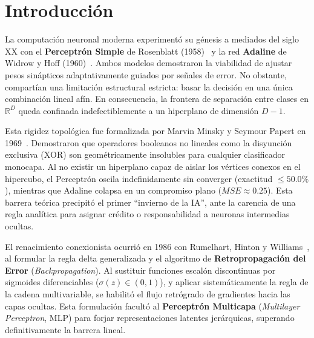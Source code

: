 \documentclass{article}
\begin{document}
\vspace{0.35cm}

\section{Introducción}

La computación neuronal moderna experimentó su génesis a mediados del siglo XX con el \textbf{Perceptrón Simple} de Rosenblatt (1958)~\cite{rosenblatt1958} y la red \textbf{Adaline} de Widrow y Hoff (1960)~\cite{widrow1960}. Ambos modelos demostraron la viabilidad de ajustar pesos sinápticos adaptativamente guiados por señales de error. No obstante, compartían una limitación estructural estricta: basar la decisión en una única combinación lineal afín. En consecuencia, la frontera de separación entre clases en $\mathbb{R}^D$ queda confinada indefectiblemente a un hiperplano de dimensión $D-1$.

Esta rigidez topológica fue formalizada por Marvin Minsky y Seymour Papert en 1969~\cite{minsky1969}. Demostraron que operadores booleanos no lineales como la disyunción exclusiva ($\text{XOR}$) son geométricamente insolubles para cualquier clasificador monocapa. Al no existir un hiperplano capaz de aislar los vértices conexos en el hipercubo, el Perceptrón oscila indefinidamente sin converger (exactitud $\le 50.0\%$), mientras que Adaline colapsa en un compromiso plano ($MSE \approx 0.25$). Esta barrera teórica precipitó el primer ``invierno de la IA'', ante la carencia de una regla analítica para asignar crédito o responsabilidad a neuronas intermedias ocultas.

El renacimiento conexionista ocurrió en 1986 con Rumelhart, Hinton y Williams~\cite{rumelhart1986}, al formular la regla delta generalizada y el algoritmo de \textbf{Retropropagación del Error} (\textit{Backpropagation}). Al sustituir funciones escalón discontinuas por sigmoides diferenciables ($\sigma(z) \in (0, 1)$), y aplicar sistemáticamente la regla de la cadena multivariable, se habilitó el flujo retrógrado de gradientes hacia las capas ocultas. Esta formulación facultó al \textbf{Perceptrón Multicapa} (\textit{Multilayer Perceptron}, MLP) para forjar representaciones latentes jerárquicas, superando definitivamente la barrera lineal.
\end{document}
